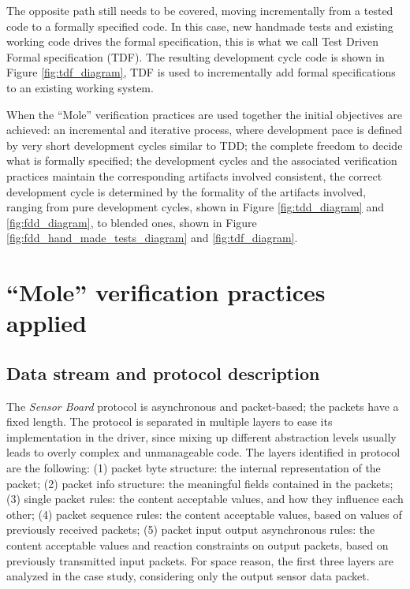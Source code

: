 \documentclass{article}
\newcommand{\SB}{\emph{Sensor Board}\xspace}
\begin{document}
The opposite path still needs to be covered, moving incrementally from a tested code to a formally specified code.
In this case, new handmade tests and existing working code drives the formal specification, this is what we call Test Driven Formal specification (TDF).
The resulting development cycle code is shown in Figure \ref{fig:tdf_diagram}, TDF is used to incrementally add formal specifications to an existing working system.

When the ``Mole'' verification practices are used together the initial objectives are achieved: an incremental and iterative process, where development pace is defined by very short development cycles similar to TDD; the complete freedom to decide what is formally specified; the development cycles and the associated verification practices maintain the corresponding artifacts involved consistent, the correct development cycle is determined by the formality of the artifacts involved, ranging from pure development cycles, shown in Figure \ref{fig:tdd_diagram} and \ref{fig:fdd_diagram}, to blended ones, shown in Figure \ref{fig:fdd_hand_made_tests_diagram} and \ref{fig:tdf_diagram}.



\section{``Mole'' verification practices applied}
\label{sec:a_complex_case_study}

\subsection{Data stream and protocol description}
\label{subsec:data_stream_and_protocol_description}

The \SB protocol is asynchronous and packet-based; the packets have a fixed length.  
The protocol is separated in multiple layers to ease its implementation in the driver, since mixing up different abstraction levels usually leads to overly complex and unmanageable code.  
The layers identified in protocol are the following: (1) packet byte structure: the internal representation of the packet; (2) packet info structure: the meaningful fields contained in the packets; (3) single packet rules: the content acceptable values, and how they influence each other; (4) packet sequence rules: the content acceptable values, based on values of previously received packets; (5) packet input output asynchronous rules: the content acceptable values and reaction constraints on output packets, based on previously transmitted input packets.
For space reason, the first three layers are analyzed in the case study, considering only the output sensor data packet.
\end{document}
